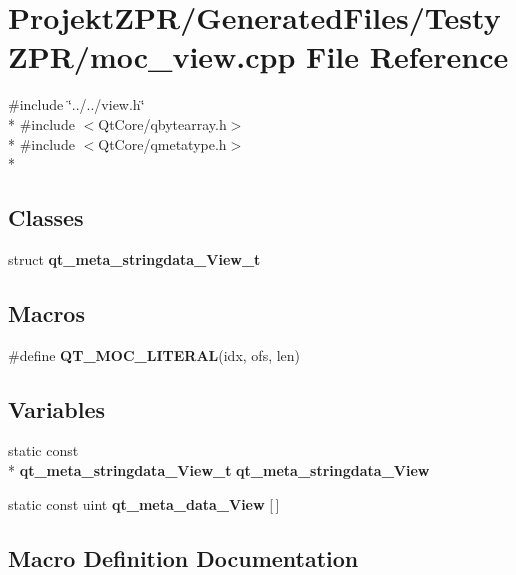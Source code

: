 \section{Projekt\-Z\-P\-R/\-Generated\-Files/\-Testy\-Z\-P\-R/moc\-\_\-view.cpp File Reference}
\label{_testy_z_p_r_2moc__view_8cpp}
{\ttfamily \#include \char`\"{}../../view.\-h\char`\"{}}\\*
{\ttfamily \#include $<$Qt\-Core/qbytearray.\-h$>$}\\*
{\ttfamily \#include $<$Qt\-Core/qmetatype.\-h$>$}\\*
\subsection*{Classes}
\begin{DoxyCompactItemize}
\item 
struct {\bf qt\-\_\-meta\-\_\-stringdata\-\_\-\-View\-\_\-t}
\end{DoxyCompactItemize}
\subsection*{Macros}
\begin{DoxyCompactItemize}
\item 
\#define {\bf Q\-T\-\_\-\-M\-O\-C\-\_\-\-L\-I\-T\-E\-R\-A\-L}(idx, ofs, len)
\end{DoxyCompactItemize}
\subsection*{Variables}
\begin{DoxyCompactItemize}
\item 
static const \\*
{\bf qt\-\_\-meta\-\_\-stringdata\-\_\-\-View\-\_\-t} {\bf qt\-\_\-meta\-\_\-stringdata\-\_\-\-View}
\item 
static const uint {\bf qt\-\_\-meta\-\_\-data\-\_\-\-View} [$\,$]
\end{DoxyCompactItemize}


\subsection{Macro Definition Documentation}
